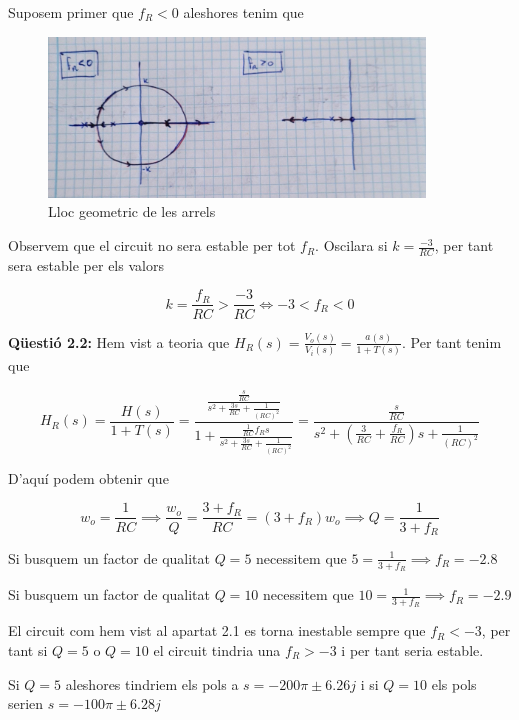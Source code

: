 \documentclass[12pt, a4papre]{article}
\begin{document}
	Suposem primer que $f_R < 0$ aleshores tenim que 
	
	\begin{figure}[H]
		\begin{center}
		\includegraphics[width=100mm]{img_p_3_1.jpeg}
		\caption{Lloc geometric de les arrels}
		\end{center}
	\end{figure}
	
	Observem que el circuit no sera estable per tot $f_R$. Oscilara si $k = \frac{-3}{RC}$, per tant sera estable per els valors
	
	\[
		k = \frac{f_R}{RC} > \frac{-3}{RC} \iff -3 < f_R < 0
	\]	
	
	\textbf{Qüestió 2.2:} Hem vist a teoria que $H_R(s) = \frac{V_o(s)}{V_i(s)}  = \frac{a(s)}{1+T(s)}$. Per tant tenim que
	
	\[
		H_R(s) = \frac{H(s)}{1+T(s)} = \frac{\frac{\frac{s}{RC}}{s^2+\frac{3s}{RC}+\frac{1}{(RC)^2}}}{1+ \frac{\frac{1}{RC}f_R s}{s^2+\frac{3s}{RC}+\frac{1}{(RC)^2}}} = \frac{\frac{s}{RC}}{s^2+\left(\frac{3}{RC}+\frac{f_R}{RC}\right)s+\frac{1}{(RC)^2}}
	\]
	
	D'aquí podem obtenir que 
	
	\[
		w_o = \frac{1}{RC} \implies \frac{w_o}{Q} = \frac{3+f_R}{RC} = (3+f_R)w_o \implies Q = \frac{1}{3+f_R}
	\]
	
	Si busquem un factor de qualitat $Q=5$ necessitem que $5 = \frac{1}{3+f_R} \implies f_R = -2.8$
	
	Si busquem un factor de qualitat $Q=10$ necessitem que $10 = \frac{1}{3+f_R} \implies f_R = -2.9$
	
	El circuit com hem vist al apartat 2.1 es torna inestable sempre que $f_R < -3$, per tant si $Q = 5$ o $Q = 10$ el circuit tindria una $f_R > -3$ i per tant seria estable.
	
	Si $Q = 5$ aleshores tindriem els pols a $s = -200\pi \pm 6.26j$ i si $Q = 10$ els pols serien $s = -100\pi \pm 6.28j$
	
\end{document}
